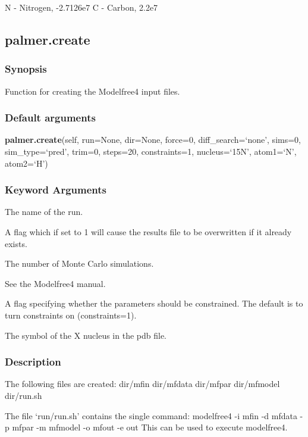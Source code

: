     N - Nitrogen, -2.7126e7
    C - Carbon, 2.2e7


\newpage

\subsection{palmer.create}


\subsubsection{Synopsis}

Function for creating the Modelfree4 input files.

\subsubsection{Default arguments}

\textsf{\textbf{palmer.create}(self, run=None, dir=None, force=0, diff\_search=`none', sims=0, sim\_type=`pred', trim=0, steps=20, constraints=1, nucleus=`15N', atom1=`N', atom2=`H')}


\subsubsection{Keyword Arguments}

  The name of the run.

  A flag which if set to 1 will cause the results file to be overwritten if it already exists.

  The number of Monte Carlo simulations.

  See the Modelfree4 manual.

  A flag specifying whether the parameters should be constrained.  The default is to turn constraints on (constraints=1).

  The symbol of the X nucleus in the pdb file.


\subsubsection{Description}

The following files are created:
    dir/mfin
    dir/mfdata
    dir/mfpar
    dir/mfmodel
    dir/run.sh

The file `run/run.sh' contains the single command:
    modelfree4 -i mfin -d mfdata -p mfpar -m mfmodel -o mfout -e out
This can be used to execute modelfree4.


